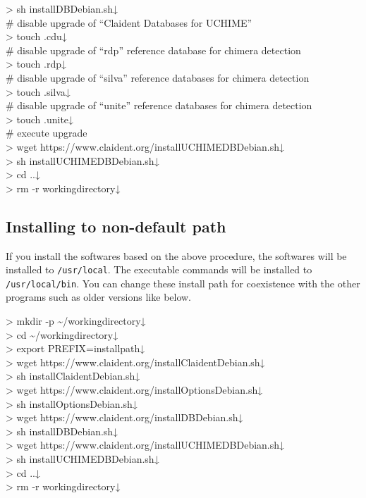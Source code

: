 \documentclass[titlepage,10pt,a4paper,english]{jsbook}
\newenvironment{cmd}{\begin{oframed}\raggedright\ttfamily\footnotesize\setlength{\baselineskip}{1.4em}}{\end{oframed}\vspace{-1em}}
\begin{document}
\begin{cmd}
{\textgreater} sh installDB{\textunderscore}Debian.sh↓\\
\# disable upgrade of ``Claident Databases for UCHIME''\\
{\textgreater} touch .cdu↓\\
\# disable upgrade of ``rdp'' reference database for chimera detection\\
{\textgreater} touch .rdp↓\\
\# disable upgrade of ``silva'' reference databases for chimera detection\\
{\textgreater} touch .silva↓\\
\# disable upgrade of ``unite'' reference databases for chimera detection\\
{\textgreater} touch .unite↓\\
\# execute upgrade\\
{\textgreater} wget https://www.claident.org/installUCHIMEDB{\textunderscore}Debian.sh↓\\
{\textgreater} sh installUCHIMEDB{\textunderscore}Debian.sh↓\\
{\textgreater} cd ..↓\\
{\textgreater} rm -r workingdirectory↓
\end{cmd}

\subsection{Installing to non-default path}

If you install the softwares based on the above procedure, the softwares will be installed to \texttt{/usr/local}.
The executable commands will be installed to \texttt{/usr/local/bin}.
You can change these install path for coexistence with the other programs such as older versions like below.

\begin{cmd}
{\textgreater} mkdir -p {\textasciitilde}/workingdirectory↓\\
{\textgreater} cd {\textasciitilde}/workingdirectory↓\\
{\textgreater} export PREFIX=install{\textunderscore}path↓\\
{\textgreater} wget https://www.claident.org/installClaident{\textunderscore}Debian.sh↓\\
{\textgreater} sh installClaident{\textunderscore}Debian.sh↓\\
{\textgreater} wget https://www.claident.org/installOptions{\textunderscore}Debian.sh↓\\
{\textgreater} sh installOptions{\textunderscore}Debian.sh↓\\
{\textgreater} wget https://www.claident.org/installDB{\textunderscore}Debian.sh↓\\
{\textgreater} sh installDB{\textunderscore}Debian.sh↓\\
{\textgreater} wget https://www.claident.org/installUCHIMEDB{\textunderscore}Debian.sh↓\\
{\textgreater} sh installUCHIMEDB{\textunderscore}Debian.sh↓\\
{\textgreater} cd ..↓\\
{\textgreater} rm -r workingdirectory↓
\end{cmd}
\end{document}
